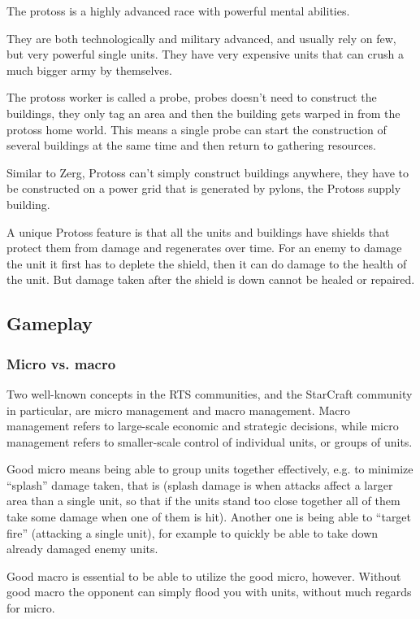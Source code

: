 The protoss is a highly advanced race with powerful mental abilities.

They are both technologically and military advanced, and usually rely on few, but very powerful single units. They have very expensive units that can crush a much bigger army by themselves.

The protoss worker is called a probe, probes doesn't need to construct the buildings, they only tag an area and then the building gets warped in from the protoss home world. This means a single probe can start the construction of several buildings at the same time and then return to gathering resources.

Similar to Zerg, Protoss can't simply construct buildings anywhere, they have to be constructed on a power grid that is generated by pylons, the Protoss supply building.

A unique Protoss feature is that all the units and buildings have shields that protect them from damage and regenerates over time. For an enemy to damage the unit it first has to deplete the shield, then it can do damage to the health of the unit. But damage taken after the shield is down cannot be healed or repaired.

\subsection{Gameplay}
\subsubsection{Micro vs. macro}
Two well-known concepts in the RTS communities, and the StarCraft community in particular, are micro management and macro management. Macro management refers to large-scale economic and strategic decisions, while micro management refers to smaller-scale control of individual units, or groups of units.

Good micro means being able to group units together effectively, e.g. to minimize ``splash'' damage taken, that is (splash damage is when attacks affect a larger area than a single unit, so that if the units stand too close together all of them take some damage when one of them is hit). Another one is being able to ``target fire'' (attacking a single unit), for example to quickly be able to take down already damaged enemy units.

Good macro is essential to be able to utilize the good micro, however. Without good macro the opponent can simply flood you with units, without much regards for micro.

